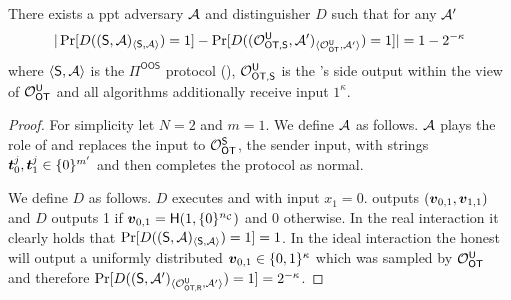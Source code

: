 \begin{lemma} \label{lem:malRec}
	There exists a ppt adversary $\Adv$ and distinguisher $D$ such that for any $\Adv'$ 
	$$
	|\Pr[D((\send, \Adv)_{\langle\send, \Adv\rangle})=1]-\Pr[D((\O^{\U}_{\textsf{OT,\send}}, \Adv')_{\langle\OOT^\U, \Adv'\rangle})=1]|=1-2^{-\kappa}
	$$
	where $\langle\send, \Adv\rangle$ is the $\Pi^{\textsf{OOS}}$ protocol (), $\O^{\U}_{\textsf{OT,\send}}$ is the \rec's side output within the view of $\OOT^{\U}$ and all algorithms additionally receive input $1^\kappa$. 
\end{lemma}
\begin{proof}
	For simplicity let $N=2$ and $m=1$. We define $\Adv$ as follows. $\Adv$ plays the role of \rec and replaces the input to $\OOT^\send$, the sender input, with strings $\tt_0^j,\tt_1^j\in \{0\}^{m'}$ and then completes the protocol as normal.
	
	We define $D$ as follows. $D$ executes \send and \Adv with input $x_1=0$. \send outputs $(\vv_{0,1},\vv_{1,1})$ and $D$ outputs 1 if $\vv_{0,1}=\H(1, \{0\}^\nc)$ and 0 otherwise. In the real interaction it clearly holds that $\Pr[D((\send, \Adv)_{\langle\send, \Adv\rangle})=1]=1$. In the ideal interaction the honest \send will output a uniformly distributed $\vv_{0,1}\in\{0,1\}^\kappa$ which was sampled by $\OOT^{\U}$ and therefore $\Pr[D((\send, \Adv')_{\langle\O^{\U}_{\textsf{OT,\rec}}, \Adv'\rangle})=1]=2^{-\kappa}$.
\end{proof}



